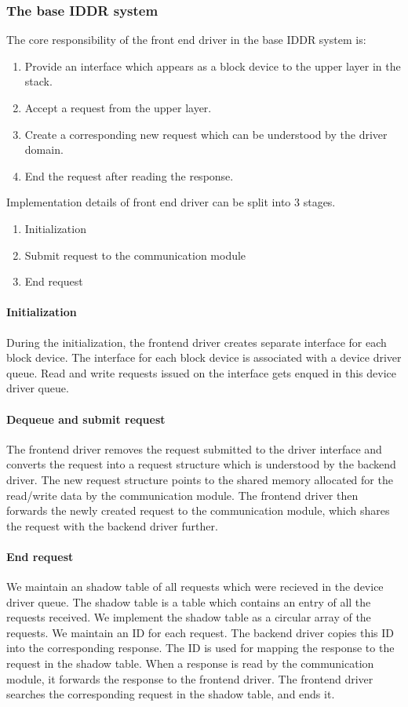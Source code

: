 \subsubsection*{The base IDDR system}
The core responsibility of the front end driver in the base IDDR system is:
\begin{enumerate}
\item Provide an interface which appears as a block device to the upper layer in the stack.
\item Accept a request from the upper layer.
\item Create a corresponding new request which can be understood by the driver domain.
\item End the request after reading the response.
\end{enumerate}

Implementation details of front end driver can be split into 3 stages. 
\begin{enumerate}
\item Initialization
\item Submit request to the communication module
\item End request
\end{enumerate}

\paragraph{Initialization}
During the initialization, the frontend driver creates separate interface for each block device. The interface for each block device is associated with a device driver queue. Read and write requests issued on the interface gets enqued in this device driver queue.

\paragraph{Dequeue and submit request}
The frontend driver removes the request submitted to the driver interface and converts the request into a request structure which is understood by the backend driver. The new request structure points to the shared memory allocated for the read/write data by the communication module. The frontend driver then forwards the newly created request to the communication module, which shares the request with the backend driver further.

\paragraph{End request}
We maintain an shadow table of all requests which were recieved in the device driver queue. The shadow table is a table which contains an entry of all the requests received. We implement the shadow table as a circular array of the requests. We maintain an ID for each request. The backend driver copies this ID into the corresponding response. The ID is used for mapping the response to the request in the shadow table. When a response is read by the communication module, it forwards the response to the frontend driver. The frontend driver searches the corresponding request in the shadow table, and ends it. 

